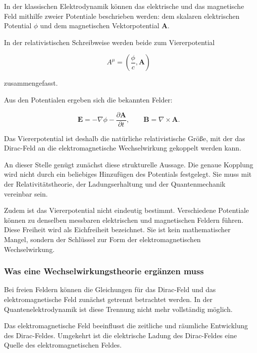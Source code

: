 In der klassischen Elektrodynamik können das elektrische und das
magnetische Feld mithilfe zweier Potentiale beschrieben werden:
dem skalaren elektrischen Potential \(\phi\) und dem magnetischen
Vektorpotential \(\mathbf A\).

In der relativistischen Schreibweise werden beide zum
Viererpotential

\begin{equation}
	A^\mu
	=
	\left(
	\frac{\phi}{c},
	\mathbf A
	\right)
	\label{eq:viererpotential_qed}
\end{equation}

zusammengefasst.

Aus den Potentialen ergeben sich die bekannten Felder:

\begin{equation}
	\mathbf E
	=
	-\nabla\phi
	-
	\frac{\partial\mathbf A}{\partial t},
	\qquad
	\mathbf B
	=
	\nabla\times\mathbf A.
	\label{eq:felder_aus_potentialen_qed}
\end{equation}

Das Viererpotential ist deshalb die natürliche relativistische Größe,
mit der das Dirac-Feld an die elektromagnetische Wechselwirkung
gekoppelt werden kann.

An dieser Stelle genügt zunächst diese strukturelle Aussage.
Die genaue Kopplung wird nicht durch ein beliebiges Hinzufügen des
Potentials festgelegt.
Sie muss mit der Relativitätstheorie, der Ladungserhaltung und der
Quantenmechanik vereinbar sein.

Zudem ist das Viererpotential nicht eindeutig bestimmt.
Verschiedene Potentiale können zu denselben messbaren elektrischen und
magnetischen Feldern führen.
Diese Freiheit wird als Eichfreiheit bezeichnet.
Sie ist kein mathematischer Mangel, sondern der Schlüssel zur Form der
elektromagnetischen Wechselwirkung.

\subsubsection*{Was eine Wechselwirkungstheorie ergänzen muss}

Bei freien Feldern können die Gleichungen für das Dirac-Feld und das
elektromagnetische Feld zunächst getrennt betrachtet werden.
In der Quantenelektrodynamik ist diese Trennung nicht mehr vollständig
möglich.

Das elektromagnetische Feld beeinflusst die zeitliche und räumliche
Entwicklung des Dirac-Feldes.
Umgekehrt ist die elektrische Ladung des Dirac-Feldes eine Quelle des
elektromagnetischen Feldes.

